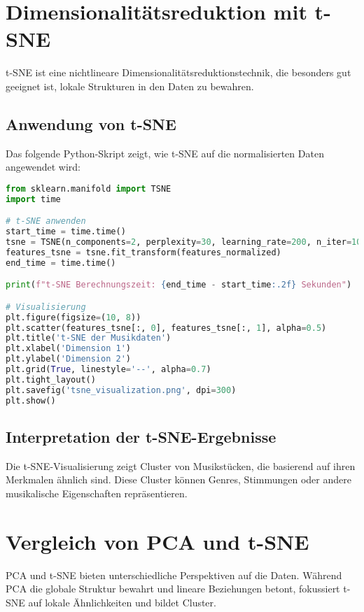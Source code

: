 \section{Dimensionalitätsreduktion mit t-SNE}

t-SNE ist eine nichtlineare Dimensionalitätsreduktionstechnik, die besonders gut geeignet ist, lokale Strukturen in den Daten zu bewahren.

\subsection{Anwendung von t-SNE}

Das folgende Python-Skript zeigt, wie t-SNE auf die normalisierten Daten angewendet wird:

\begin{lstlisting}[language=python, caption={t-SNE-Analyse der Musikdaten}]
from sklearn.manifold import TSNE
import time

# t-SNE anwenden
start_time = time.time()
tsne = TSNE(n_components=2, perplexity=30, learning_rate=200, n_iter=1000, random_state=42)
features_tsne = tsne.fit_transform(features_normalized)
end_time = time.time()

print(f"t-SNE Berechnungszeit: {end_time - start_time:.2f} Sekunden")

# Visualisierung
plt.figure(figsize=(10, 8))
plt.scatter(features_tsne[:, 0], features_tsne[:, 1], alpha=0.5)
plt.title('t-SNE der Musikdaten')
plt.xlabel('Dimension 1')
plt.ylabel('Dimension 2')
plt.grid(True, linestyle='--', alpha=0.7)
plt.tight_layout()
plt.savefig('tsne_visualization.png', dpi=300)
plt.show()
\end{lstlisting}

\subsection{Interpretation der t-SNE-Ergebnisse}

Die t-SNE-Visualisierung zeigt Cluster von Musikstücken, die basierend auf ihren Merkmalen ähnlich sind. Diese Cluster können Genres, Stimmungen oder andere musikalische Eigenschaften repräsentieren.

\section{Vergleich von PCA und t-SNE}

PCA und t-SNE bieten unterschiedliche Perspektiven auf die Daten. Während PCA die globale Struktur bewahrt und lineare Beziehungen betont, fokussiert t-SNE auf lokale Ähnlichkeiten und bildet Cluster.

